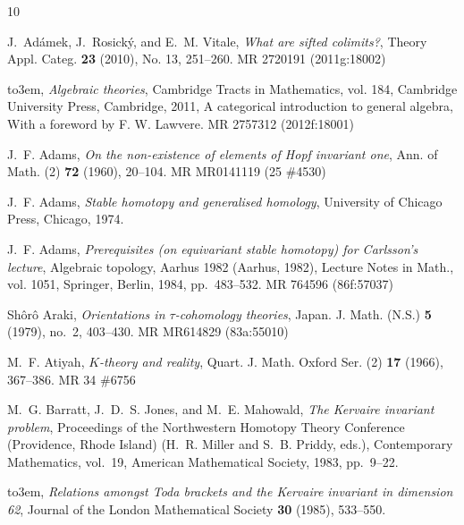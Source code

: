 \documentclass{amsart}
\theoremstyle{definition}
\theoremstyle{remark}
\begin{document}
\def\cprime{$'$}
\providecommand{\bysame}{\leavevmode\hbox to3em{\hrulefill}\thinspace}
\providecommand{\MR}{\relax\ifhmode\unskip\space\fi MR }
\providecommand{\MRhref}[2]{%
  \href{http://www.ams.org/mathscinet-getitem?mr=#1}{#2}
}
\providecommand{\href}[2]{#2}
\begin{thebibliography}{10}

J.~Ad{\'a}mek, J.~Rosick{\'y}, and E.~M. Vitale, \emph{What are sifted
  colimits?}, Theory Appl. Categ. \textbf{23} (2010), No. 13, 251--260.
  \MR{2720191 (2011g:18002)}

\bysame, \emph{Algebraic theories}, Cambridge Tracts in Mathematics, vol. 184,
  Cambridge University Press, Cambridge, 2011, A categorical introduction to
  general algebra, With a foreword by F. W. Lawvere. \MR{2757312 (2012f:18001)}

J.~F. Adams, \emph{On the non-existence of elements of {H}opf invariant one},
  Ann. of Math. (2) \textbf{72} (1960), 20--104. \MR{MR0141119 (25 \#4530)}

J.~F. Adams, \emph{Stable homotopy and generalised homology}, University of
  Chicago Press, Chicago, 1974.

J.~F. Adams, \emph{Prerequisites (on equivariant stable homotopy) for
  {C}arlsson's lecture}, Algebraic topology, {A}arhus 1982 ({A}arhus, 1982),
  Lecture Notes in Math., vol. 1051, Springer, Berlin, 1984, pp.~483--532.
  \MR{764596 (86f:57037)}

Sh{\^o}r{\^o} Araki, \emph{Orientations in {$\tau $}-cohomology theories},
  Japan. J. Math. (N.S.) \textbf{5} (1979), no.~2, 403--430. \MR{MR614829
  (83a:55010)}

M.~F. Atiyah, \emph{{$K$}-theory and reality}, Quart. J. Math. Oxford Ser. (2)
  \textbf{17} (1966), 367--386. \MR{34 \#6756}

M.~G. Barratt, J.~D.~S. Jones, and M.~E. Mahowald, \emph{The {Kervaire}
  invariant problem}, Proceedings of the Northwestern Homotopy Theory
  Conference (Providence, Rhode Island) (H.~R. Miller and S.~B. Priddy, eds.),
  Contemporary Mathematics, vol.~19, American Mathematical Society, 1983,
  pp.~9--22.

\bysame, \emph{Relations amongst {Toda} brackets and the {Kervaire } invariant
  in dimension 62}, Journal of the London Mathematical Society \textbf{30}
  (1985), 533--550.


\end{thebibliography}
\end{document}
